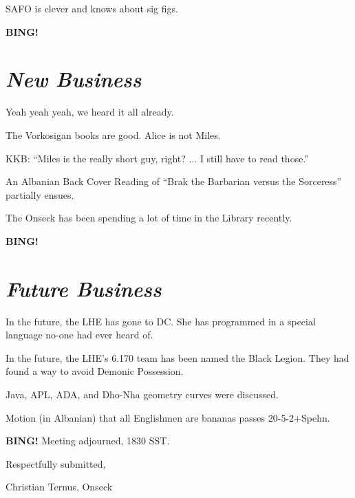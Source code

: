 \documentclass[10pt]{article}
\newcommand{\bing}{{\bf BING!} }
\newcommand{\goto}[1]{\bing \vskip 12pt \section*{{\em{#1}}}}
\begin{document}
SAFO is clever and knows about sig figs.

\goto{New Business}

Yeah yeah yeah, we heard it all already.

The Vorkosigan books are good.  Alice is not Miles.

KKB: ``Miles is the really short guy, right?  ... I still have to read those.''

An Albanian Back Cover Reading of ``Brak the Barbarian versus the Sorceress''  partially ensues.

The Onseck has been spending a lot of time in the Library recently.

\goto{Future Business}

In the future, the LHE has gone to DC.  She has programmed in a special language no-one had ever heard of.

In the future, the LHE's 6.170 team has been named the Black Legion.  They had found a way to avoid Demonic Possession.

Java, APL, ADA, and Dho-Nha geometry curves were discussed.

Motion (in Albanian) that all Englishmen are bananas passes 20-5-2+Spehn.

\bing
\noindent
Meeting adjourned, 1830 SST.

\vspace{18pt}

\centerline{Respectfully submitted,}
\centerline{Christian Ternus, Onseck}
\end{document}
